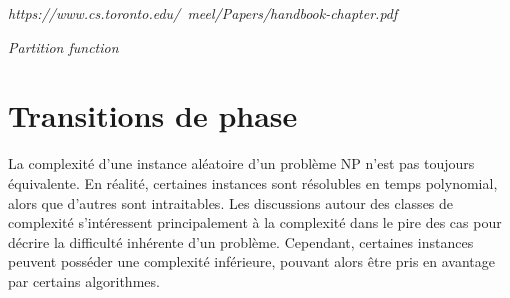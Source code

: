 \textcolor{mydarkred}{\textit{https://www.cs.toronto.edu/~meel/Papers/handbook-chapter.pdf}}

\textcolor{mydarkred}{\textit{Partition function}}


\section{Transitions de phase}
\label{sec:transitions-de-phase}

La complexité d'une instance aléatoire d'un problème \textsf{NP} n'est pas toujours équivalente. En réalité, certaines instances sont résolubles en temps polynomial, alors que d'autres sont intraitables. Les discussions autour des classes de complexité s'intéressent principalement à la complexité dans le pire des cas pour décrire la difficulté inhérente d'un problème. Cependant, certaines instances peuvent posséder une complexité inférieure, pouvant alors être pris en avantage par certains algorithmes. 

